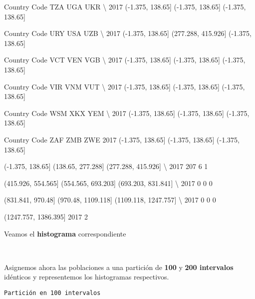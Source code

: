 \documentclass[11pt]{article}
\begin{document}
Country Code               TZA               UGA               UKR  \textbackslash{}
2017          (-1.375, 138.65]  (-1.375, 138.65]  (-1.375, 138.65]   

Country Code               URY                 USA               UZB  \textbackslash{}
2017          (-1.375, 138.65]  (277.288, 415.926]  (-1.375, 138.65]   

Country Code               VCT               VEN               VGB  \textbackslash{}
2017          (-1.375, 138.65]  (-1.375, 138.65]  (-1.375, 138.65]   

Country Code               VIR               VNM               VUT  \textbackslash{}
2017          (-1.375, 138.65]  (-1.375, 138.65]  (-1.375, 138.65]   

Country Code               WSM               XKX               YEM  \textbackslash{}
2017          (-1.375, 138.65]  (-1.375, 138.65]  (-1.375, 138.65]   

Country Code               ZAF               ZMB               ZWE  
2017          (-1.375, 138.65]  (-1.375, 138.65]  (-1.375, 138.65]  
            
      (-1.375, 138.65]  (138.65, 277.288]  (277.288, 415.926]  \textbackslash{}
2017               207                  6                   1   

      (415.926, 554.565]  (554.565, 693.203]  (693.203, 831.841]  \textbackslash{}
2017                   0                   0                   0   

      (831.841, 970.48]  (970.48, 1109.118]  (1109.118, 1247.757]  \textbackslash{}
2017                  0                   0                     0   

      (1247.757, 1386.395]  
2017                     2  
            
    Veamos el \textbf{histograma} correspondiente

    \begin{center}
    \end{center}
    { \hspace*{\fill} \\}
    
    Asignemos ahora las poblaciones a una partición de \textbf{100} y
\textbf{200 intervalos} idénticos y representemos los histogramas
respectivos.

    \begin{Verbatim}[commandchars=\\\{\}]
Partición en 100 intervalos

    \end{Verbatim}
\end{document}
